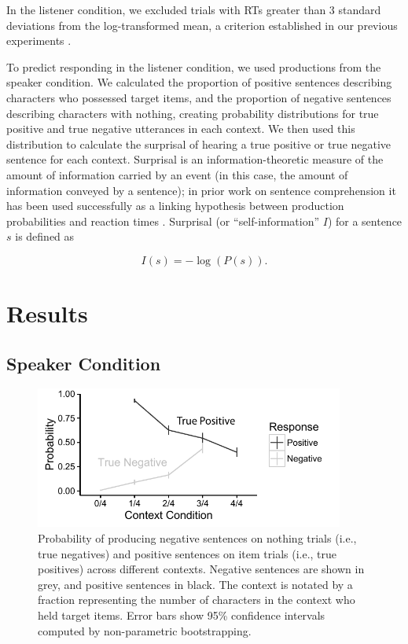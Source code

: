 \documentclass[man, noapacite]{apa2}
\begin{document}
In the listener condition, we excluded trials with RTs greater than 3 standard deviations from the log-transformed mean, a criterion established in our previous experiments \cite{nordmeyer2014}.  

To predict responding in the listener condition, we used productions from the speaker condition. We calculated the proportion of positive sentences describing characters who possessed target items, and the proportion of negative sentences describing characters with nothing, creating probability distributions for true positive and true negative utterances in each context.  We then used this distribution to calculate the surprisal of hearing a true positive or true negative sentence for each context. Surprisal is an information-theoretic measure of the amount of information carried by an event (in this case, the amount of information conveyed by a sentence); in prior work on sentence comprehension it has been used successfully as a linking hypothesis between production probabilities and reaction times \cite{levy2008}. Surprisal (or ``self-information'' $I$) for a sentence $s$ is defined as

\begin{equation}
\label{eq:surprise}
I(s) = -\log(P(s)).
\end{equation}

\section{Results}

\subsection{Speaker Condition}

\begin{figure}[t]
\begin{center} 
\includegraphics[width=4in]{figures/probs.pdf}
\caption{\label{fig:speakerprobs} Probability of producing negative sentences on nothing trials (i.e., true negatives) and positive sentences on item trials (i.e., true positives) across different contexts. Negative sentences are shown in grey, and positive sentences in black.  The context is notated by a fraction representing the number of characters in the context who held target items. Error bars show 95\% confidence intervals computed by non-parametric bootstrapping.  }
\end{center} 
\end{figure}
\end{document}

